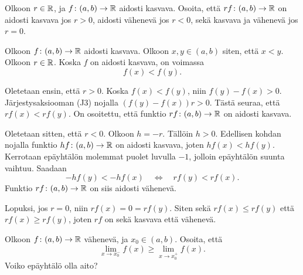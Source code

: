 \documentclass[11pt,a4paper]{amsart}
\begin{document}
\begin{exercise}
  Olkoon \(r \in \mathbb{R}\), ja \(f\colon (a,b) \to \mathbb{R}\) aidosti kasvava.
  Osoita, että \(rf\colon (a,b) \to \mathbb{R}\) on aidosti kasvava jos
  \(r > 0\), aidosti vähenevä jos \(r < 0\), sekä kasvava ja vähenevä
  jos \(r = 0\).
\end{exercise}

\begin{solution}
  Olkoon \(f \colon (a, b) \to \mathbb{R}\) aidosti kasvava.
  Olkoon \(x, y \in (a, b)\) siten, että \(x < y\). Olkoon \(r \in \mathbb{R}\).
  Koska \(f\) on aidosti kasvava, on voimassa
  \[
    f(x) < f(y).
  \]

  Oletetaan ensin, että \(r > 0\).
  Koska \(f(x) < f(y)\), niin \(f(y) - f(x) > 0\). Järjestysaksiooman
  (J3) nojalla \(\left(f(y) - f(x)\right)r > 0\). Tästä seuraa, että
  \(rf(x) < rf(y)\). On osoitettu, että funktio
  \(rf \colon (a, b) \to \mathbb{R}\) on aidosti kasvava.

  Oletetaan sitten, että \(r < 0\). Olkoon \(h = -r\). Tällöin
  \(h > 0\). Edellisen kohdan nojalla funktio
  \(hf \colon (a, b) \to \mathbb{R}\) on aidosti kasvava, joten \(hf(x) < hf(y)\).
  Kerrotaan epäyhtälön molemmat puolet luvulla \(-1\), jolloin
  epäyhtälön suunta vaihtuu. Saadaan
  \[
    -hf(y) < -hf(x) \quad \iff \quad rf(y) < rf(x).
  \]
  Funktio \(rf \colon (a, b) \to \mathbb{R}\) on siis aidosti vähenevä.

  Lopuksi, jos \(r = 0\), niin \(rf(x) = 0 = rf(y)\). Siten sekä
  \(rf(x) \leq rf(y)\) että \(rf(x) \geq rf(y)\), joten \(rf\) on
  sekä kasvava että vähenevä.
\end{solution}

\begin{exercise}
  Olkoon \(f\colon (a,b) \to \mathbb{R}\) vähenevä, ja \(x_0 \in (a,b)\).
  Osoita, että
  \[
    \lim_{x \to x_0^-} f(x) \geq \lim_{x \to x_0^+} f(x).
  \]
  Voiko epäyhtälö olla aito?
\end{exercise}
\end{document}
